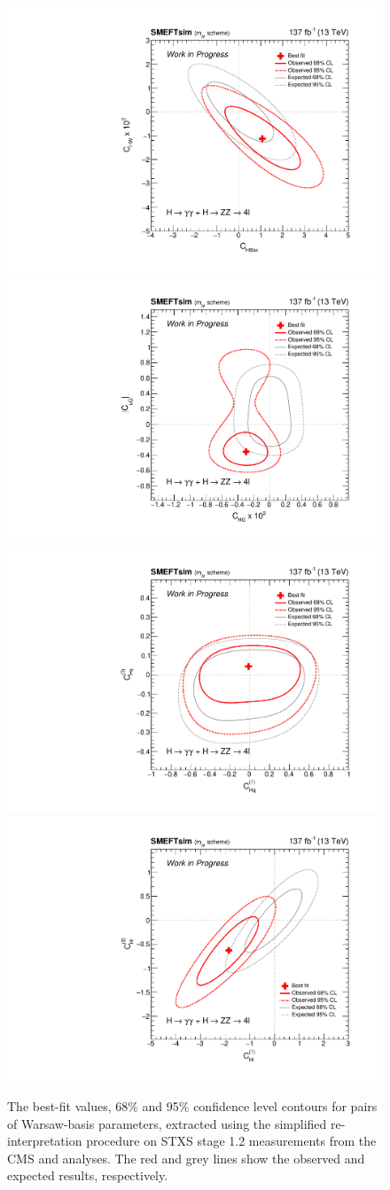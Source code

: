 \begin{figure}
  \centering
  \includegraphics[width=.49\textwidth]{Figures/eft/smeft/chi2_chbox_vs_chw.pdf}
  \includegraphics[width=.49\textwidth]{Figures/eft/smeft/chi2_chg_vs_cugabs.pdf}
  \includegraphics[width=.49\textwidth]{Figures/eft/smeft/chi2_chq1_vs_chq3.pdf}
  \includegraphics[width=.49\textwidth]{Figures/eft/smeft/chi2_chl1_vs_chl3.pdf}
  \caption[Results of simplified re-interpretation fits in Warsaw basis]
  {
    The best-fit values, 68\% and 95\% confidence level contours for pairs of Warsaw-basis parameters, extracted using the simplified re-interpretation procedure on STXS stage 1.2 measurements from the CMS \Hgg and \Hfl analyses. The red and grey lines show the observed and expected results, respectively.
  }
  \label{fig:smeft_chi2}
\end{figure}

